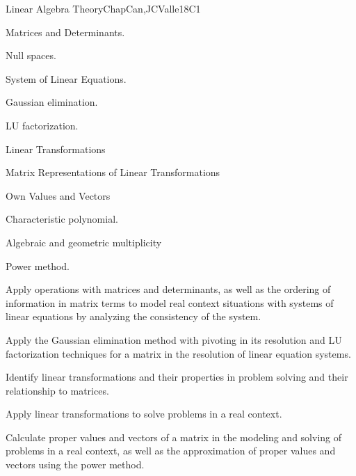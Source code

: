 \begin{syllabus}
 \begin{unit}{Linear Algebra Theory}{}{ChapCan,JCValle}{18}{C1}
   \begin{topics}
       \item Matrices and Determinants.
       \item Null spaces.
       \item System of Linear Equations.
         \begin{subtopics}
           \item Gaussian elimination.
           \item LU factorization.
         \end{subtopics}
       \item Linear Transformations
         \begin{subtopics}
           \item Matrix Representations of Linear Transformations
         \end{subtopics}
       \item Own Values and Vectors
         \begin{subtopics}
           \item Characteristic polynomial.
           \item Algebraic and geometric multiplicity
           \item Power method.
         \end{subtopics}
    \end{topics}
 
    \begin{learningoutcomes}
       \item Apply operations with matrices and determinants, as well as the ordering of information in matrix terms to model real context situations with systems of linear equations by analyzing the consistency of the system.
       \item Apply the Gaussian elimination method with pivoting in its resolution and LU factorization techniques for a matrix in the resolution of linear equation systems.
       \item Identify linear transformations and their properties in problem solving and their relationship to matrices.
       \item Apply linear transformations to solve problems in a real context.
       \item Calculate proper values and vectors of a matrix in the modeling and solving of problems in a real context, as well as the approximation of proper values and vectors using the power method.
    \end{learningoutcomes}
 \end{unit}
 

\end{syllabus}
